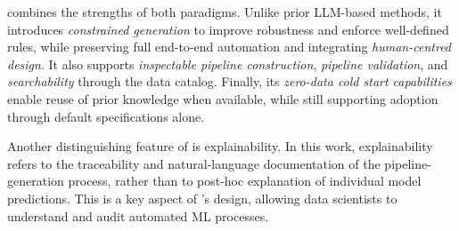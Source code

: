 \documentclass[runningheads]{llncs}
\begin{document}
\ourapproach{} combines the strengths of both paradigms.
%
Unlike prior \ac{LLM}-based methods,
it introduces \emph{constrained generation} to improve robustness and enforce well-defined rules,
while preserving full end-to-end automation and integrating \emph{human-centred design}.
%
It also supports \emph{inspectable pipeline construction},
\emph{pipeline validation},
and \emph{searchability} through the data catalog.
%
Finally, 
its \emph{zero-data cold start capabilities} enable reuse of prior knowledge when available,
while still supporting adoption through default specifications alone.

Another distinguishing feature of \ourapproach{} is explainability.
%
In this work, 
explainability refers to the traceability and natural-language documentation of the pipeline-generation process, 
rather than to post-hoc explanation of individual model predictions.
%
This is a key aspect of \ourapproach{}'s design,
allowing data scientists to understand and audit automated \ac{ML} processes.


\end{document}
